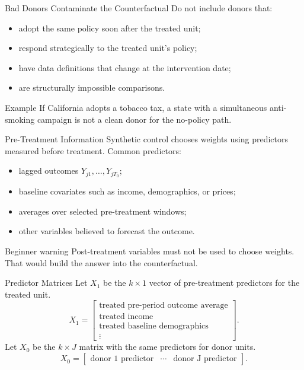 \documentclass[11pt,aspectratio=169]{beamer}
\begin{document}
\begin{frame}{Bad Donors Contaminate the Counterfactual}
  Do not include donors that:
  \begin{itemize}
    \item adopt the same policy soon after the treated unit;
    \item respond strategically to the treated unit's policy;
    \item have data definitions that change at the intervention date;
    \item are structurally impossible comparisons.
  \end{itemize}
  \begin{block}{Example}
    If California adopts a tobacco tax, a state with a simultaneous anti-smoking campaign is not a clean donor for the no-policy path.
  \end{block}
\end{frame}

\begin{frame}{Pre-Treatment Information}
  Synthetic control chooses weights using predictors measured before treatment.
  Common predictors:
  \begin{itemize}
    \item lagged outcomes \(Y_{j1},\ldots,Y_{jT_0}\);
    \item baseline covariates such as income, demographics, or prices;
    \item averages over selected pre-treatment windows;
    \item other variables believed to forecast the outcome.
  \end{itemize}
  \begin{block}{Beginner warning}
    Post-treatment variables must not be used to choose weights. That would build the answer into the counterfactual.
  \end{block}
\end{frame}

\begin{frame}{Predictor Matrices}
  Let \(X_1\) be the \(k\times 1\) vector of pre-treatment predictors for the treated unit.
  \[
    X_1=
    \begin{bmatrix}
      \text{treated pre-period outcome average}\\
      \text{treated income}\\
      \text{treated baseline demographics}\\
      \vdots
    \end{bmatrix}.
  \]
  Let \(X_0\) be the \(k\times J\) matrix with the same predictors for donor units.
  \[
    X_0=
    \begin{bmatrix}
      \text{donor 1 predictor} & \cdots & \text{donor J predictor}
    \end{bmatrix}.
  \]
\end{frame}
\end{document}
